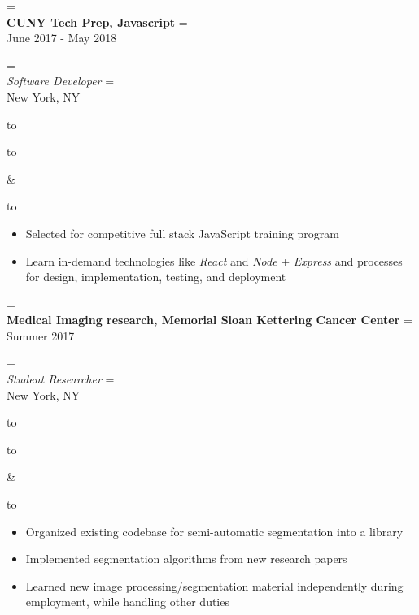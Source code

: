 \documentclass{article}
\newcommand{\appendtotoks}[2]{%
  #1=\expandafter{\the#1#2}%
}
\def\gobble#1{}
\def\gobblefirst#1{%
  #1\expandafter\expandafter\expandafter{\expandafter\gobble\the#1}}
\newcommand{\sectionTitle}[1]{{\Large #1} \vspace{4pt}}
\newenvironment{resumesection}[1]
  {\sectionTitle{#1}}
	{\vspace{10pt}}
\newcommand{\placeStyle}[1]{\textbf{#1}}
\newcommand{\positionStyle}[1]{\textit{#1}}
\newenvironment{newplace}
  {
    \newtoks\leftToks
    \newtoks\rightToks
    \newcommand{\placerow}[2]{%
      \appendtotoks{\leftToks}{\\\placeStyle{##1}}%
      \appendtotoks{\rightToks}{\\##2}}
    \newcommand{\jobrow}[2]{%
      \appendtotoks{\leftToks}{\\\positionStyle{##1}}%
      \appendtotoks{\rightToks}{\\##2}}
    \newcommand{\plainrow}[2]{%
      \appendtotoks{\leftToks}{\\##1}%
      \appendtotoks{\rightToks}{\\##2}}
    \setlength{\tabcolsep}{0pt}%
  }
  {%
    \begin{tabu} to \linewidth [h!]{X[65,l]X[35,r]}
      \begin{tabu} to \linewidth {X}
        \gobblefirst\leftToks
        \the\leftToks
      \end{tabu}
      &
      \begin{tabu} to \linewidth {X[r]}
        \gobblefirst\rightToks
        \the\rightToks
      \end{tabu}
    \end{tabu}%
  }
\newenvironment{bullets}
	{\begin{itemize}[noitemsep, topsep=0pt]}
	{\end{itemize}}
\begin{document}
\begin{resumesection}{Experience}


\begin{newplace}
	\placerow{CUNY Tech Prep, Javascript}
				   {June 2017 - May 2018}
	\jobrow  {Software Developer}
					 {New York, NY}
\end{newplace}

\begin{bullets}
  \item Selected for competitive full stack JavaScript training
        program
  \item Learn in-demand technologies like \textit{React} and
        \textit{Node} + \textit{Express} and processes for design,
        implementation, testing, and deployment
\end{bullets}


\begin{newplace}
  \placerow{Medical Imaging research, Memorial Sloan Kettering Cancer
            Center}
		   {Summer 2017}
  \jobrow  {Student Researcher}
		   {New York, NY}
\end{newplace}

\begin{bullets}
  \item Organized existing codebase for semi-automatic segmentation
        into a library
  \item Implemented segmentation algorithms from new research papers
  \item Learned new image processing/segmentation material
        independently during employment, while handling other duties
\end{bullets}


%


\end{resumesection}
\end{document}
